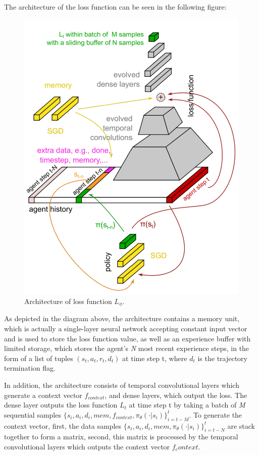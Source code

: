 \par
The architecture of the loss function can be seen in the following figure:
\begin{figure}[H]
	\includegraphics[scale=0.5]{loss-architecture.png}
	\centering
	\caption{Architecture of loss function $L_\phi$.}
	\label{loss-architecture}
\end{figure}

\par
As depicted in the diagram above, the architecture contains a memory unit, which is actually a single-layer neural network accepting constant input vector and is used to store the loss function value, as well as an experience buffer with limited storage, which stores the agent's \textit{N} most recent experience steps, in the form of a list of tuples $(s_t,a_t,r_t,d_t)$ at time step t, where \textit{$d_t$} is the trajectory termination flag.

\par
In addition, the architecture consists of temporal convolutional layers which generate a context vector $f_{context}$, and dense layers, which output the loss. The dense layer outputs the loss function \textit{$L_t$} at time step t by taking a batch of \textit{M} sequential samples $\{{s_i,a_i,d_i},mem,f_{context},\pi_\theta(\cdot|s_i)\}^t_{i=t-M}$. To generate the context vector, first, the data samples $\{{s_i,a_i,d_i},mem,\pi_\theta(\cdot|s_i)\}^t_{i=t-N}$ are stack together to form a matrix, second, this matrix is processed by the temporal convolutional layers which outputs the context vector $f_context$.

